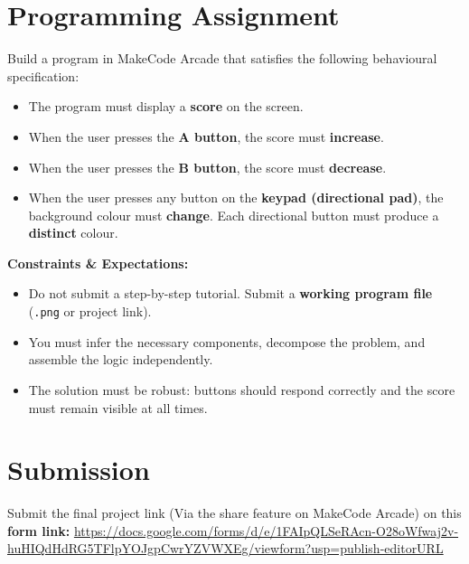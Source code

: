 \documentclass[11pt,a4paper]{article}
\begin{document}
	\section*{Programming Assignment}
	
	Build a program in MakeCode Arcade that satisfies the following behavioural specification:
	
	\begin{itemize}[leftmargin=*]
		\item The program must display a \textbf{score} on the screen.
		\item When the user presses the \textbf{A button}, the score must \textbf{increase}.
		\item When the user presses the \textbf{B button}, the score must \textbf{decrease}.
		\item When the user presses any button on the \textbf{keypad (directional pad)}, the background colour must \textbf{change}. Each directional button must produce a \textbf{distinct} colour.
	\end{itemize}
	
	\noindent\textbf{Constraints \& Expectations:}
	\begin{itemize}
		\item Do not submit a step-by-step tutorial. Submit a \textbf{working program file} (\texttt{.png} or project link).
		\item You must infer the necessary components, decompose the problem, and assemble the logic independently.
		\item The solution must be robust: buttons should respond correctly and the score must remain visible at all times.
	\end{itemize}
	
	\section*{Submission}
	Submit the final project link (Via the share feature on MakeCode Arcade) on this \textbf{form link:}
	\url{https://docs.google.com/forms/d/e/1FAIpQLSeRAcn-O28oWfwaj2v-huHIQdHdRG5TFlpYOJgpCwrYZVWXEg/viewform?usp=publish-editorURL}
	
\end{document}
